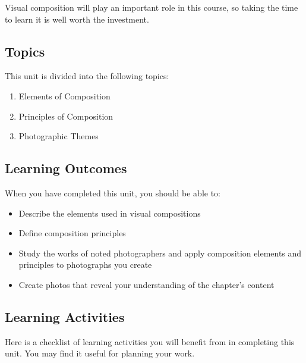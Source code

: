 \documentclass[
  letterpaper,
  DIV=11,
  numbers=noendperiod]{scrreprt}
\providecommand{\tightlist}{%
  \setlength{\itemsep}{0pt}\setlength{\parskip}{0pt}}\usepackage{longtable,booktabs,array}
\begin{document}
Visual composition will play an important role in this course, so taking
the time to learn it is well worth the investment.

\subsection*{Topics}\label{topics-2}

This unit is divided into the following topics:

\begin{enumerate}
\def\labelenumi{\arabic{enumi}.}
\tightlist
\item
  Elements of Composition
\item
  Principles of Composition
\item
  Photographic Themes
\end{enumerate}

\subsection*{Learning Outcomes}\label{learning-outcomes-2}

When you have completed this unit, you should be able to:

\begin{itemize}
\tightlist
\item
  Describe the elements used in visual compositions
\item
  Define composition principles
\item
  Study the works of noted photographers and apply composition elements
  and principles to photographs you create
\item
  Create photos that reveal your understanding of the chapter's content
\end{itemize}

\subsection*{Learning Activities}\label{learning-activities-2}

Here is a checklist of learning activities you will benefit from in
completing this unit. You may find it useful for planning your work.
\end{document}
